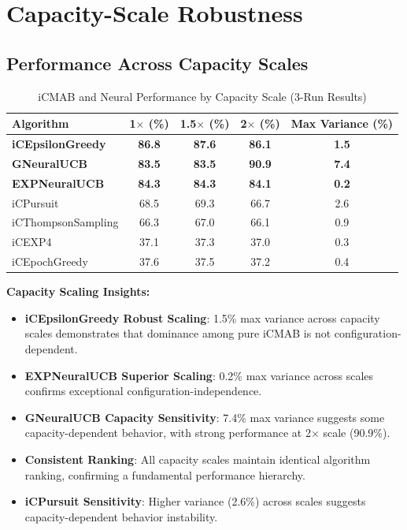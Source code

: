 \documentclass[12pt,a4paper]{article}
\newcommand{\primarytext}[1]{\textcolor{primaryblue}{\textbf{#1}}}
\newcommand{\secondarytext}[1]{\textcolor{secondaryblue}{\textbf{#1}}}
\newcommand{\warning}[1]{\textcolor{warningred}{\textbf{#1}}}
\newcommand{\legacy}[1]{\textcolor{legacycolor}{\textbf{#1}}}
\newcommand{\neural}[1]{\textcolor{neuralcolor}{\textbf{#1}}}
\begin{document}
\section{Capacity-Scale Robustness}

\subsection{Performance Across Capacity Scales}

\begin{table}[H]
\centering
\caption{iCMAB and Neural Performance by Capacity Scale (3-Run Results)}
\label{tab:capacity-scale}
\begin{tabular}{@{}lcccc@{}}
\toprule
\textbf{Algorithm} & \textbf{1$\times$ (\%)} & \textbf{1.5$\times$ (\%)} & \textbf{2$\times$ (\%)} & \textbf{Max Variance (\%)} \\
\midrule
\primarytext{iCEpsilonGreedy}   & \primarytext{86.8} & \primarytext{87.6} & \primarytext{86.1} & \primarytext{1.5} \\
\neural{GNeuralUCB}            & \neural{83.5} & \neural{83.5} & \neural{90.9} & \neural{7.4} \\
\legacy{EXPNeuralUCB}           & \legacy{84.3} & \legacy{84.3} & \legacy{84.1} & \legacy{0.2} \\
iCPursuit                       & 68.5 & 69.3 & 66.7 & 2.6 \\
iCThompsonSampling              & 66.3 & 67.0 & 66.1 & 0.9 \\
iCEXP4                          & 37.1 & 37.3 & 37.0 & 0.3 \\
iCEpochGreedy                   & 37.6 & 37.5 & 37.2 & 0.4 \\
\bottomrule
\end{tabular}
\end{table}

\textbf{Capacity Scaling Insights:}
\begin{itemize}
\item \primarytext{iCEpsilonGreedy Robust Scaling}: 1.5\% max variance across capacity scales demonstrates that dominance among pure iCMAB is not configuration-dependent.
\item \legacy{EXPNeuralUCB Superior Scaling}: 0.2\% max variance across scales confirms exceptional configuration-independence.
\item \neural{GNeuralUCB Capacity Sensitivity}: 7.4\% max variance suggests some capacity-dependent behavior, with strong performance at 2$\times$ scale (90.9\%).
\item \secondarytext{Consistent Ranking}: All capacity scales maintain identical algorithm ranking, confirming a fundamental performance hierarchy.
\item \warning{iCPursuit Sensitivity}: Higher variance (2.6\%) across scales suggests capacity-dependent behavior instability.
\end{itemize}
\end{document}
